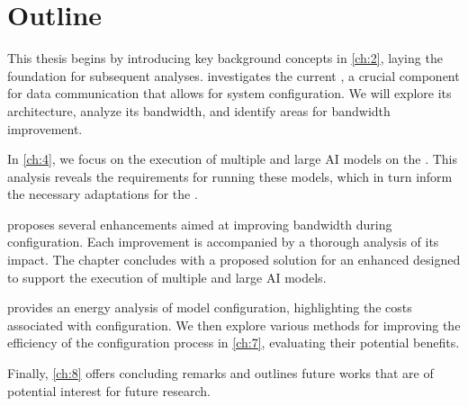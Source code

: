 \section{Outline}
This thesis begins by introducing key background concepts in \cref{ch:2}, laying the foundation for subsequent analyses.
 investigates the current \confignoc{}, a crucial component for data communication that allows for system configuration.
We will explore its architecture, analyze its bandwidth, and identify areas for bandwidth improvement.

In \cref{ch:4}, we focus on the execution of multiple and large AI models on the \graicore{}.
This analysis reveals the requirements for running these models, which in turn inform the necessary adaptations for the \confignoc{}.

 proposes several \confignoc{} enhancements aimed at improving bandwidth during configuration.
Each improvement is accompanied by a thorough analysis of its impact.
The chapter concludes with a proposed solution for an enhanced \confignoc{} designed to support the execution of multiple and large AI models.

 provides an energy analysis of model configuration, highlighting the costs associated with configuration. 
We then explore various methods for improving the efficiency of the configuration process in \cref{ch:7}, evaluating their potential benefits.

Finally, \cref{ch:8} offers concluding remarks and outlines future works that are of potential interest for future research.




